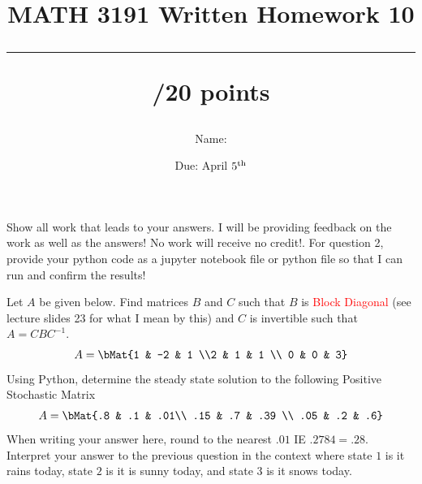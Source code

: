 \documentclass{exam}
\title{MATH 3191 Written Homework 10\\\rule{30pt}{1pt}/20 points}
\author{Name: \rule{150pt}{1pt}}
\date{Due: April $5^\textnormal{th}$}
\begin{document}
\maketitle
Show all work that leads to your answers. I will be providing feedback on the work as well as the answers!
No work will receive no credit!. For question 2, provide your python code as a jupyter notebook file
or python file so that I can run and confirm the results!
\begin{questions}
    \question[10] Let $A$ be given below. Find matrices $B$ and $C$ such that $B$ is \textcolor{red}{Block Diagonal} (see lecture slides 23 for what I mean by this) and $C$ is invertible such that
    $A = CBC^{-1}$.
    \[
        A = \bMat{1 & -2 & 1 \\2 & 1 & 1 \\ 0 & 0 & 3}
    \]
    \newpage
    \question[5] Using Python, determine the steady state solution to the following Positive Stochastic Matrix
    \[
        A = \bMat{.8 & .1 & .01\\ .15 & .7 & .39 \\ .05 & .2 & .6}
    \]
    When writing your answer here, round to the nearest $.01$ IE $.2784 = .28$.
    \vfill
    \question[5] Interpret your answer to the previous question in the context where state $1$ is
    it rains today, state $2$ is it is sunny today, and state $3$ is it snows today.
    \vfill
\end{questions}
\end{document}
